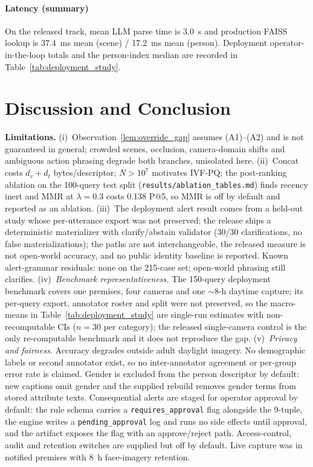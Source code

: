 ﻿\documentclass[conference]{IEEEtran}
\theoremstyle{plain}
\begin{document}
\paragraph*{Latency (summary)}
On the released track, mean LLM parse time is 3.0~s and production FAISS lookup is 37.4~ms mean (scene) / 17.2~ms mean (person). Deployment operator-in-the-loop totals and the person-index median are recorded in Table~\ref{tab:deployment_study}.

\section{Discussion and Conclusion}

\textbf{Limitations.} (i)~Observation~\ref{lem:override_gap} assumes (A1)--(A2) and is not guaranteed in general; crowded scenes, occlusion, camera-domain shifts and ambiguous action phrasing degrade both branches, unisolated here. (ii)~Concat costs $d_v+d_t$ bytes/descriptor; $N>10^7$ motivates IVF-PQ; the post-ranking ablation on the 100-query test split (\texttt{results/\allowbreak ablation\_\allowbreak tables.md}) finds recency inert and MMR at $\lambda{=}0.3$ costs 0.138 P@5, so MMR is off by default and reported as an ablation. (iii)~The deployment alert result comes from a held-out study whose per-utterance export was not preserved; the release ships a deterministic materializer with clarify/abstain validator (30/30 clarifications, no false materializations); the paths are not interchangeable, the released measure is not open-world accuracy, and no public identity baseline is reported. Known alert-grammar residuals: none on the 215-case set; open-world phrasing still clarifies. (iv)~\emph{Benchmark representativeness.} The 150-query deployment benchmark covers one premises, four cameras and one $\sim$8-h daytime capture; its per-query export, annotator roster and split were not preserved, so the macro-means in Table~\ref{tab:deployment_study} are single-run estimates with non-recomputable CIs ($n{=}30$ per category); the released single-camera control is the only re-computable benchmark and it does not reproduce the gap. (v)~\emph{Privacy and fairness.} Accuracy degrades outside adult daylight imagery. No demographic labels or second annotator exist, so no inter-annotator agreement or per-group error rate is claimed. Gender is excluded from the person descriptor by default: new captions
omit gender and the supplied rebuild removes gender terms from stored
attribute texts. Consequential alerts are staged
for operator approval by default: the rule schema carries a
\texttt{requires\_approval} flag alongside the 9-tuple, the engine writes a
\texttt{pending\_approval} log and runs no side effects until approval, and
the artifact exposes the flag with an approve/reject path. Access-control,
audit and retention switches are supplied but off by default. Live capture was in notified premises with 8~h face-imagery retention.
\end{document}
